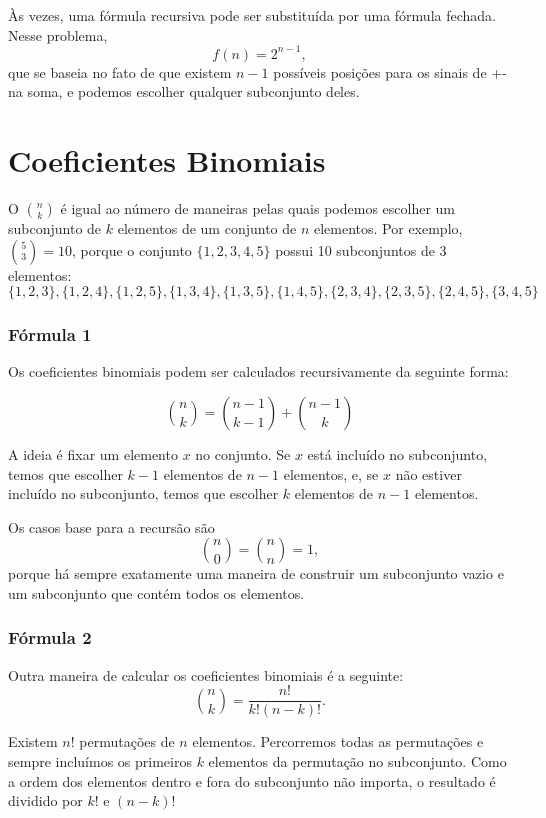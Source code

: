 Às vezes, uma fórmula recursiva pode ser substituída
por uma fórmula fechada.
Nesse problema,
\[
f(n)=2^{n-1},
\]
que se baseia no fato de que existem $n-1$
possíveis posições para os sinais de +- na soma,
e podemos escolher qualquer subconjunto deles.

\section{Coeficientes Binomiais}


O  ${n \choose k}$
é igual ao número de maneiras pelas quais podemos escolher um subconjunto 
de $k$ elementos de um conjunto de $n$ elementos.
Por exemplo, ${5 \choose 3}=10$,
porque o conjunto $\{1,2,3,4,5\}$
possui 10 subconjuntos de 3 elementos: 
\[ \{1,2,3\}, \{1,2,4\}, \{1,2,5\}, \{1,3,4\}, \{1,3,5\}, 
\{1,4,5\}, \{2,3,4\}, \{2,3,5\}, \{2,4,5\}, \{3,4,5\} \]

\subsubsection{Fórmula 1}

Os coeficientes binomiais podem ser
calculados recursivamente da seguinte forma:

\[
{n \choose k}  =  {n-1 \choose k-1} + {n-1 \choose k}
\]

A ideia é fixar um elemento $x$ no conjunto.
Se $x$ está incluído no subconjunto,
temos que escolher $k-1$
elementos de $n-1$ elementos,
e, se $x$ não estiver incluído no subconjunto,
temos que escolher $k$ elementos de $n-1$ elementos.

Os casos base para a recursão são
\[
{n \choose 0}  =  {n \choose n} = 1,
\]
porque há sempre exatamente
uma maneira de construir um subconjunto vazio
e um subconjunto que contém todos os elementos.

\subsubsection{Fórmula 2}

Outra maneira de calcular os coeficientes binomiais é a seguinte:
\[
{n \choose k}  =  \frac{n!}{k!(n-k)!}.
\]

Existem $n!$ permutações de $n$ elementos.
Percorremos todas as permutações e sempre
incluímos os primeiros $k$ elementos da permutação
no subconjunto.
Como a ordem dos elementos dentro e fora do subconjunto
não importa,
o resultado é dividido por $k!$ e $(n-k)!$

